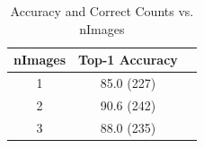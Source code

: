 \documentclass[12pt]{article}
\begin{document}
\begin{table}[]
    \centering
    \begin{tabular}{c|cc}
    nImages & Top-1 Accuracy\\ \hline
1 & 85.0 (227)  \\ 2 & 90.6 (242)\\ 3 & 88.0 (235)  \\ 
    \end{tabular}
    \caption{Accuracy and Correct Counts vs. nImages}
    \label{tab:nimages}
\end{table}




\end{document}

